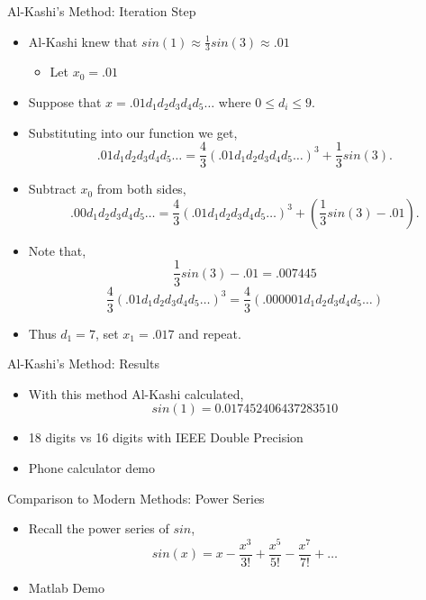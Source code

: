 \documentclass[10pt]{beamer}
\begin{document}
\begin{frame}{Al-Kashi's Method: Iteration Step}
  \begin{itemize}
    \item Al-Kashi knew that $sin(1) \approx \frac{1}{3} sin(3)\approx .01$
    \begin{itemize}
      \item Let $x_0 = .01$
    \end{itemize}
    \item Suppose that $x = .01d_1d_2d_3d_4d_5\dots$ where $0 \leq d_i \leq 9$.
    \item Substituting into our function we get,
    \begin{equation*}
      .01d_1d_2d_3d_4d_5\dots = \frac{4}{3}(.01d_1d_2d_3d_4d_5\dots)^3 + \frac{1}{3} sin(3).
    \end{equation*}
    \item Subtract $x_0$ from both sides,
    \begin{equation*}
      .00d_1d_2d_3d_4d_5\dots = \frac{4}{3}(.01d_1d_2d_3d_4d_5\dots)^3 + (\frac{1}{3} sin(3) - .01).
    \end{equation*}
    \item Note that,
      \begin{equation*}
        \frac{1}{3} sin(3) - .01 = .007445
      \end{equation*}
      \begin{equation*}
        \frac{4}{3}(.01d_1d_2d_3d_4d_5\dots)^3 = \frac{4}{3}(.000001d_1d_2d_3d_4d_5\dots)
      \end{equation*}
      \item Thus $d_1 = 7$, set $x_1 = .017$ and repeat.
  \end{itemize}
\end{frame}

\begin{frame}{Al-Kashi's Method: Results}
  \begin{itemize}
    \item With this method Al-Kashi calculated,
    \begin{equation*}
      sin(1) =  0.017452406437283510
    \end{equation*}
    \item 18 digits vs 16 digits with IEEE Double Precision 
    \item Phone calculator demo
  \end{itemize}
\end{frame}

\begin{frame}{Comparison to Modern Methods: Power Series}
  \begin{itemize}
    \item Recall the power series of $sin$,
    \begin{equation*}
      sin(x) = x - \frac{x^3}{3!} + \frac{x^5}{5!} - \frac{x^7}{7!} + \dots
    \end{equation*}
    \item Matlab Demo
  \end{itemize}
\end{frame}
\end{document}
